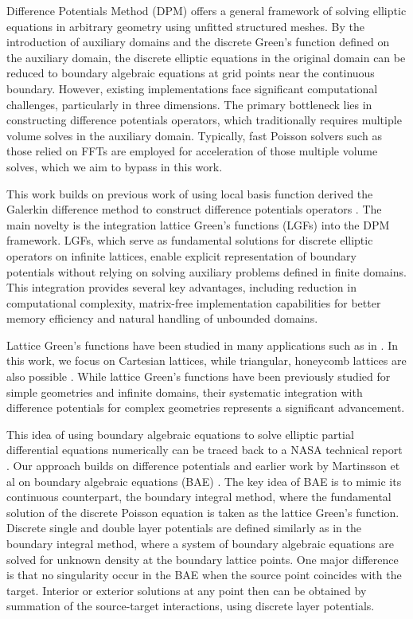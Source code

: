 Difference Potentials Method (DPM) \cite{ryaben2012method} offers a general framework of solving elliptic equations in arbitrary geometry using unfitted structured meshes. By the introduction of auxiliary domains and the discrete Green's function defined on the auxiliary domain, the discrete elliptic equations in the original domain can be reduced to boundary algebraic equations at grid points near the continuous boundary.  However, existing implementations face significant computational challenges, particularly in three dimensions. The primary bottleneck lies in constructing difference potentials operators, which traditionally requires multiple volume solves in the auxiliary domain. Typically, fast Poisson solvers such as those relied on FFTs are employed for acceleration of those multiple volume solves, which we aim to bypass in this work.

This work builds on previous work of using local basis function derived the Galerkin difference method \cite{banks2016galerkin} to construct difference potentials operators \cite{xia2023local}. The main novelty is the integration lattice Green's functions (LGFs) into the DPM framework. LGFs, which serve as fundamental solutions for discrete elliptic operators on infinite lattices, enable explicit representation of boundary potentials without relying on solving auxiliary problems defined in finite domains. This integration provides several key advantages, including reduction in computational complexity, matrix-free implementation capabilities for better memory efficiency and natural handling of unbounded domains.

Lattice Green's functions have been studied in many applications such as in \cite{liska2016fast,dorschner2020fast,liska2014parallel,cserti2000application,joyce2004exact,borwein2013lattice}.  In this work, we focus on Cartesian lattices, while triangular, honeycomb lattices are also possible \cite{zhao2011extension}. While lattice Green's functions have been previously studied for simple geometries and infinite domains, their systematic integration with difference potentials for complex geometries represents a significant advancement. 

This idea of using boundary algebraic equations to solve elliptic partial differential equations numerically can be traced back to a NASA technical report \cite{saltzer1958discrete}. Our approach builds on difference potentials and earlier work by Martinsson et al on boundary algebraic equations (BAE) \cite{martinsson2009boundary}. The key idea of BAE is to mimic its continuous counterpart, the boundary integral method, where the fundamental solution of the discrete Poisson equation is taken as the lattice Green's function. Discrete single and double layer potentials are defined similarly as in the boundary integral method, where a system of boundary algebraic equations are solved for unknown density at the boundary lattice points. One major difference is that no singularity occur in the BAE when the source point coincides with the target. Interior or exterior solutions at any point then can be obtained by summation of the source-target interactions, using discrete layer potentials. 

